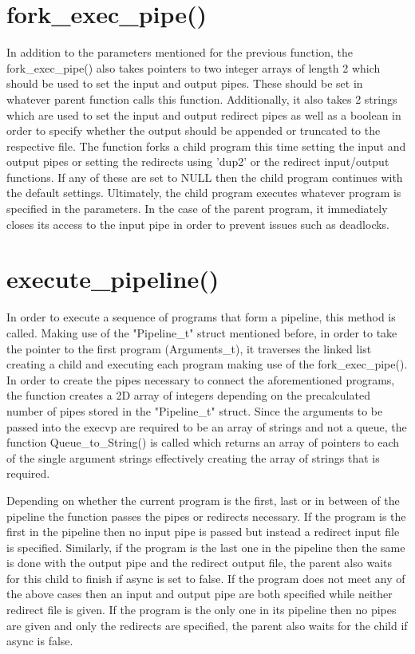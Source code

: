 \documentclass[12pt, a4paper]{report}
\begin{document}
\section{fork\_exec\_pipe()}
In addition to the parameters mentioned for the previous function, the fork\_exec\_pipe() also takes pointers to two integer arrays of length 2 which should be used to set the input and output pipes. These should be set in whatever parent function calls this function. Additionally, it also takes 2 strings which are used to set the input and output redirect pipes as well as a boolean in order to specify whether the output should be appended or truncated to the respective file. The function forks a child program this time setting the input and output pipes or setting the redirects using 'dup2' or the redirect input/output functions. If any of these are set to NULL then the child program continues with the default settings. Ultimately, the child program executes whatever program is specified in the parameters. In the case of the parent program, it immediately closes its access to the input pipe in order to prevent issues such as deadlocks.

\section{execute\_pipeline()}
In order to execute a sequence of programs that form a pipeline, this method is called. Making use of the "Pipeline\_t" struct mentioned before, in order to take the pointer to the first program (Arguments\_t), it traverses the linked list creating a child and executing each program making use of the fork\_exec\_pipe(). In order to create the pipes necessary to connect the aforementioned programs, the function creates a 2D array of integers depending on the precalculated number of pipes stored in the "Pipeline\_t" struct. Since the arguments to be passed into the execvp are required to be an array of strings and not a queue, the function Queue\_to\_String() is called which returns an array of pointers to each of the single argument strings effectively creating the array of strings that is required. 

Depending on whether the current program is the first, last or in between of the pipeline the function passes the pipes or redirects necessary. If the program is the first in the pipeline then no input pipe is passed but instead a redirect input file is specified. Similarly, if the program is the last one in the pipeline then the same is done with the output pipe and the redirect output file, the parent also waits for this child to finish if async is set to false. If the program does not meet any of the above cases then an input and output pipe are both specified while neither redirect file is given. If the program is the only one in its pipeline then no pipes are given and only the redirects are specified, the parent also waits for the child if async is false.
\end{document}

